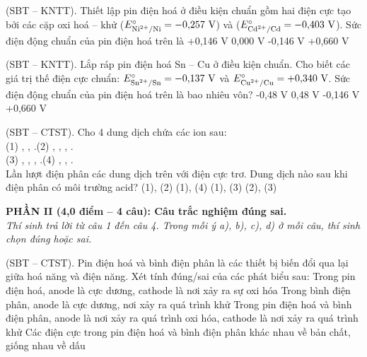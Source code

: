 \documentclass[11pt,a4paper]{article}
\def\loigiai#1{}
\begin{document}
\begin{ex}
(SBT – KNTT). Thiết lập pin điện hoá ở điều kiện chuẩn gồm hai điện cực tạo bởi các cặp oxi hoá -- khử  ($E^\circ_{\ce{Ni^2+/Ni}} = -0{,}257\text{ V}$) và  ($E^\circ_{\ce{Cd^2+/Cd}} = -0{,}403\text{ V}$). Sức điện động chuẩn của pin điện hoá trên là
\choice
{+0,146 V}
{0,000 V}
{-0,146 V}
{+0,660 V}
\loigiai{}
\end{ex}

\begin{ex}
(SBT – KNTT). Lắp ráp pin điện hoá Sn -- Cu ở điều kiện chuẩn. Cho biết các giá trị thế điện cực chuẩn: $E^\circ_{\ce{Sn^2+/Sn}} = -0{,}137\text{ V}$ và $E^\circ_{\ce{Cu^2+/Cu}} = +0{,}340\text{ V}$. Sức điện động chuẩn của pin điện hoá trên là bao nhiêu vôn?
\choice
{-0,48 V}
{0,48 V}
{-0,146 V}
{+0,660 V}
\loigiai{}
\end{ex}

\begin{ex}
(SBT – CTST). Cho 4 dung dịch chứa các ion sau:\\
(1) , , .\qquad (2) , , , .\\
(3) , , , .\qquad (4) , , .\\
Lần lượt điện phân các dung dịch trên với điện cực trơ. Dung dịch nào sau khi điện phân có môi trường acid?
\choice
{(1), (2)}
{(1), (4)}
{(1), (3)}
{(2), (3)}
\loigiai{}
\end{ex}

\newpage

\noindent
\textbf{PHẦN II (4,0 điểm -- 4 câu): Câu trắc nghiệm đúng sai.}\\
\textit{Thí sinh trả lời từ câu 1 đến câu 4. Trong mỗi ý a), b), c), d) ở mỗi câu, thí sinh chọn đúng hoặc sai.}

\setcounter{ex}{0}

\begin{ex}
(SBT – CTST). Pin điện hoá và bình điện phân là các thiết bị biến đổi qua lại giữa hoá năng và điện năng. Xét tính đúng/sai của các phát biểu sau:
\choiceTF
{Trong pin điện hoá, anode là cực dương, cathode là nơi xảy ra sự oxi hóa}
{Trong bình điện phân, anode là cực dương, nơi xảy ra quá trình khử}
{Trong pin điện hoá và bình điện phân, anode là nơi xảy ra quá trình oxi hóa, cathode là nơi xảy ra quá trình khử}
{Các điện cực trong pin điện hoá và bình điện phân khác nhau về bản chất, giống nhau về dấu}
\loigiai{}
\end{ex}
\end{document}
